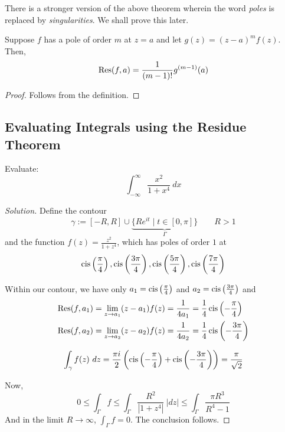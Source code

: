 There is a stronger version of the above theorem wherein the word \textit{poles} is replaced by \textit{singularities}. We shall prove this later.

\begin{proposition}
    Suppose $f$ has a pole of order $m$ at $z = a$ and let $g(z) = (z - a)^mf(z)$. Then, 
    \begin{equation*}
        \operatorname{Res}(f,a) = \frac{1}{(m - 1)!}g^{(m - 1)}(a)
    \end{equation*}
\end{proposition}
\begin{proof}
    Follows from the definition.
\end{proof}

\subsection*{Evaluating Integrals using the Residue Theorem}

\begin{example}
    Evaluate: 
    \begin{equation*}
        \int_{-\infty}^\infty\frac{x^2}{1 + x^4}~dx
    \end{equation*}
\end{example}
\begin{proof}[Solution]
Define the contour 
\begin{equation*}
    \gamma := [-R,R]\cup\underbrace{\{Re^{it}\mid t\in[0,\pi]\}}_{\Gamma}\qquad R > 1
\end{equation*}
and the function $f(z) = \frac{z^2}{1 + z^4}$, which has poles of order $1$ at 
\begin{equation*}
    \operatorname{cis}\left(\frac{\pi}{4}\right),
    \operatorname{cis}\left(\frac{3\pi}{4}\right),
    \operatorname{cis}\left(\frac{5\pi}{4}\right),
    \operatorname{cis}\left(\frac{7\pi}{4}\right)
\end{equation*}

Within our contour, we have only $a_1 = \operatorname{cis}\left(\frac{\pi}{4}\right)$ and $a_2 = \operatorname{cis}\left(\frac{3\pi}{4}\right)$ and 
\begin{align*}
    \operatorname{Res}(f,a_1) &= \lim_{z\to a_1}(z - a_1)f(z) = \frac{1}{4a_1} = \frac{1}{4}\operatorname{cis}\left(-\frac{\pi}{4}\right)\\
    \operatorname{Res}(f,a_2) &= \lim_{z\to a_2}(z - a_2)f(z) = \frac{1}{4a_2} = \frac{1}{4}\operatorname{cis}\left(-\frac{3\pi}{4}\right)
\end{align*}

\begin{equation*}
    \int_\gamma f(z)~dz =  \frac{\pi i}{2}\left(\operatorname{cis}\left(-\frac{\pi}{4}\right) + \operatorname{cis}\left(-\frac{3\pi}{4}\right)\right) = \frac{\pi}{\sqrt{2}}
\end{equation*}

Now, 
\begin{equation*}
    0\le\int_\Gamma f\le\int_\Gamma\frac{R^2}{|1 + z^4|}~|dz|\le\int_\Gamma\frac{\pi R^3}{R^4 - 1}
\end{equation*}
And in the limit $R\to\infty$, $\int_\Gamma f = 0$. The conclusion follows.
\end{proof}


